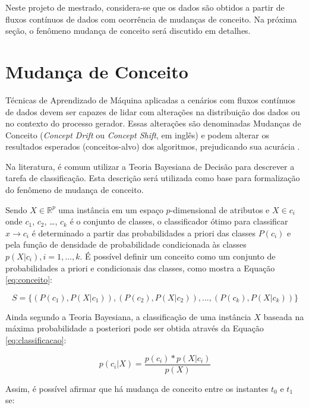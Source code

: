 \documentclass[msc, classic, a4paper]{ufbathesis}
\begin{document}
Neste projeto de mestrado, considera-se que os dados são obtidos a partir de fluxos contínuos de dados com ocorrência de mudanças de conceito.
Na próxima seção, o fenômeno mudança de conceito será discutido em detalhes.

\section{Mudança de Conceito}
\label{sec:mudanca_de_conceito}

Técnicas de Aprendizado de Máquina aplicadas a cenários com fluxos contínuos de dados devem ser capazes de lidar com alterações na distribuição dos dados ou no contexto do processo gerador.
Essas alterações são denominadas Mudanças de Conceito (\textit{Concept Drift} ou \textit{Concept Shift}, em inglês) e podem alterar os resultados esperados (conceitos-alvo) dos algoritmos, prejudicando sua acurácia \cite{Widmer:1996:LPC:226791.226798}.

Na literatura, é comum utilizar a Teoria Bayesiana de Decisão \cite{Duda:2000:PC:954544} para descrever a tarefa de classificação.
Esta descrição será utilizada como base para formalização do fenômeno de mudança de conceito.

Sendo $X \in \mathbb{R}^p$ uma instância em um espaço $p$-dimensional de atributos e $X \in c_i$ onde $c_1$, $c_2$, \ldots, $c_k$ é o conjunto de classes,
o classificador ótimo para classificar $x \rightarrow c_i$ é determinado a partir das probabilidades a priori das classes $P(c_i)$ e pela função de densidade de probabilidade condicionada às classes $p(X|c_i), i = 1, \ldots, k$.
É possível definir um conceito como um conjunto de probabilidades a priori e condicionais das classes, como mostra a Equação \ref{eq:conceito}:

\begin{equation} \label{eq:conceito}
    S = \{(P(c_1), P(X|c_1)), (P(c_2), P(X|c_2)), ..., (P(c_k), P(X|c_k))\}
\end{equation}

Ainda segundo a Teoria Bayesiana, a classificação de uma instância $X$ baseada na máxima probabilidade a posteriori pode ser obtida através da Equação \ref{eq:classificacao}:

\begin{equation} \label{eq:classificacao}
    p(c_i|X) = \frac{p(c_i) * p(X|c_i)}{p(X)}
\end{equation}

Assim, é possível afirmar que há mudança de conceito entre os instantes $t_0$ e $t_1$ se:
\end{document}
